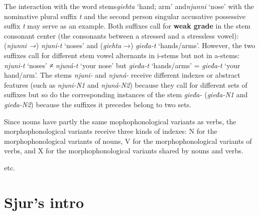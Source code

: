 \documentclass[a4paper,english]{article}
\begin{document}
The interaction with the word stems\textit{giehta} ‘hand; arm’ and\textit{njunni} ‘nose’ with the nominative plural suffix \textit{­t} and the second person singular accusative possessive suffix \textit{­t} may serve as an example. Both suffixes call for \textbf{weak grade} in the stem consonant center (the consonants between a stressed and a stressless vowel): (\textit{njunni →}) \textit{njuni-t} ‘noses’ and (\textit{giehta} →)\textit{ gieđa-t} ‘hands/arms’. However, the two suffixes call for different stem vowel alternants in i-stems but not in a-stems: \textit{njuni-t} ‘noses’ ≠ \textit{njuná-t} ‘your nose’ but \textit{gieđa-t} ‘hands/arms’ = \textit{gieđa-t} ‘your hand/arm’. The stems \textit{njuni-} and \textit{njuná-} receive different indexes or abstract features (such as \textit{njuni-N1} and \textit{njuná-N2}) because they call for different sets of suffixes but so do the corresponding instances of the stem \textit{gieđa-} (\textit{gieđa-N1} and \textit{gieđa-N2}) because the suffixes it precedes belong to two sets. 

Since nouns have partly the same mophophonological variants as verbs, the morphophonological variants receive three kinds of indexes: N for the morphophonological variants of nouns, V for the morphophonological variants of verbs, and X for the morphophonological variants shared by nouns and verbs.

 

etc.


\section{Sjur's intro}


 


\end{document}
